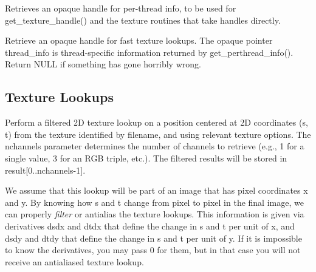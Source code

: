 
Retrieves an opaque handle for per-thread info, to be used for
{\cf get_texture_handle()} and the texture routines that take handles
directly.
\apiend


Retrieve an opaque handle for fast texture lookups.  The opaque
pointer {\cf thread_info} is thread-specific information returned by
{\cf get_perthread_info()}.  Return {\cf NULL} if something has gone
horribly wrong.

\apiend


\subsection{Texture Lookups}
\label{sec:texturesys:api:texture}


Perform a filtered 2D texture lookup on a position centered at 2D
coordinates ({\cf s}, {\cf t}) from the texture identified by
{\cf filename}, and using relevant texture {\cf options}.  The
{\cf nchannels} parameter determines the number of channels to retrieve
(e.g., 1 for a single value, 3 for an RGB triple, etc.).
The filtered results will be stored in {\cf result[0..nchannels-1]}.

We assume that this lookup will be part of an image that has pixel
coordinates {\cf x} and {\cf y}.  By knowing how {\cf s} and {\cf t}
change from pixel to pixel in the final image, we can properly
\emph{filter} or antialias the texture lookups.  This information is
given via derivatives {\cf dsdx} and {\cf dtdx} that define the change
in {\cf s} and {\cf t} per unit of {\cf x}, and {\cf dsdy} and {\cf
  dtdy} that define the change in {\cf s} and {\cf t} per unit of {\cf
  y}.  If it is impossible to know the derivatives, you may pass 0 for
them, but in that case you will not receive an antialiased texture lookup.

